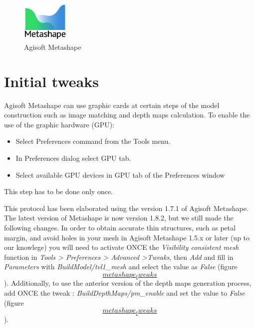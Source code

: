 \documentclass[
]{book}
\begin{document}
\begin{figure}
\centering
\includegraphics[width=0.2\textwidth,height=\textheight]{Figures/logo_metashape.jpeg}
\caption{Agisoft Metashape}
\end{figure}

\hypertarget{initial-tweaks}{%
\section{Initial tweaks}\label{initial-tweaks}}

Agisoft Metashape can use graphic cards at certain steps of the model
construction such as image matching and depth maps calculation. To
enable the use of the graphic hardware (GPU):

\begin{itemize}
\item
  Select Preferences command from the Tools menu.
\item
  In Preferences dialog select GPU tab.
\item
  Select available GPU devices in GPU tab of the Preferences window
\end{itemize}

This step has to be done only once.

This protocol has been elaborated using the version 1.7.1 of Agisoft
Metashape. The latest version of Metashape is now version 1.8.2, but we
still made the following changes. In order to obtain accurate thin
structures, such as petal margin, and avoid holes in your mesh in
Agisoft Metashape 1.5.x or later (up to our knowlege) you will need to
activate ONCE the \emph{Visibility consistent mesh} function in \emph{Tools \textgreater{}
Preferences \textgreater{} Advanced \textgreater Tweaks}, then \emph{Add} and fill in \emph{Parameters}
with \emph{BuildModel/tvl1\_mesh} and select the value as \emph{False} (figure
\protect\hyperlink{metashape_tweaks}{\[metashape_tweaks\]}). Additionally, to use the anterior
version of the depth maps generation process, add ONCE the tweak :
\emph{BuildDepthMaps/pm\_enable} and set the value to \emph{False} (figure
\protect\hyperlink{metashape_tweaks}{\[metashape_tweaks\]}).
\end{document}
